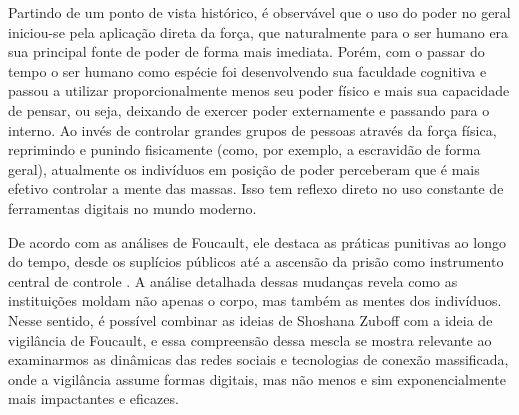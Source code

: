 \documentclass[
	12pt,
	openright,
	twoside,
	a4paper,
	english,
	french,
	spanish,
	brazil
]{abntex2}
\begin{document}
  Partindo de um ponto de vista histórico, é observável que o uso do poder no
  geral iniciou-se pela aplicação direta da força, que naturalmente para o ser
  humano era sua principal fonte de poder de forma mais imediata. Porém, com o
  passar do tempo o ser humano como espécie foi desenvolvendo sua faculdade
  cognitiva e passou a utilizar proporcionalmente menos seu poder físico e mais
  sua capacidade de pensar, ou seja, deixando de exercer poder externamente e
  passando para o interno. Ao invés de controlar grandes grupos de pessoas
  através da força física, reprimindo e punindo fisicamente (como, por exemplo,
  a escravidão de forma geral), atualmente os indivíduos em posição de poder
  perceberam que é mais efetivo controlar a mente das massas. Isso tem reflexo
  direto no uso constante de ferramentas digitais no mundo moderno.

  De acordo com as análises de Foucault, ele destaca as práticas punitivas ao
  longo do tempo, desde os suplícios públicos até a ascensão da prisão como
  instrumento central de controle \cite{foucault-vigiar-punir}. A análise
  detalhada dessas mudanças revela como as instituições moldam não apenas o
  corpo, mas também as mentes dos indivíduos. Nesse sentido, é possível combinar
  as ideias de Shoshana Zuboff com a ideia de vigilância de Foucault, e essa
  compreensão dessa mescla se mostra relevante ao examinarmos as dinâmicas das
  redes sociais e tecnologias de conexão massificada, onde a vigilância assume
  formas digitais, mas não menos e sim exponencialmente mais impactantes e
  eficazes.

  \postextual

  
\end{document}
